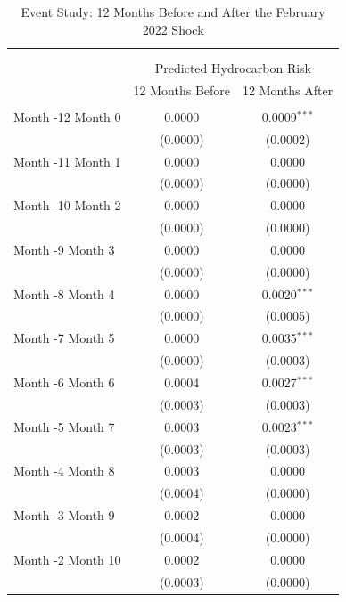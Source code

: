 
\begin{table}[!htbp] \centering 
  \caption{Event Study: 12 Months Before and After the February 2022 Shock} 
  \label{tab:eventstudy_12m_symmetric} 
\scriptsize 
\begin{tabular}{@{\extracolsep{5pt}}lcc} 
\\[-1.8ex]\hline 
\hline \\[-1.8ex] 
\\[-1.8ex] & \multicolumn{2}{c}{Predicted Hydrocarbon Risk} \\ 
 & 12 Months Before & 12 Months After \\ 
\hline \\[-1.8ex] 
 Month -12  \hfill  Month 0 & 0.0000 & 0.0009$^{***}$ \\ 
  & (0.0000) & (0.0002) \\ 
  Month -11  \hfill  Month 1 & 0.0000 & 0.0000 \\ 
  & (0.0000) & (0.0000) \\ 
  Month -10  \hfill  Month 2 & 0.0000 & 0.0000 \\ 
  & (0.0000) & (0.0000) \\ 
  Month -9  \hfill  Month 3 & 0.0000 & 0.0000 \\ 
  & (0.0000) & (0.0000) \\ 
  Month -8  \hfill  Month 4 & 0.0000 & 0.0020$^{***}$ \\ 
  & (0.0000) & (0.0005) \\ 
  Month -7  \hfill  Month 5 & 0.0000 & 0.0035$^{***}$ \\ 
  & (0.0000) & (0.0003) \\ 
  Month -6  \hfill  Month 6 & 0.0004 & 0.0027$^{***}$ \\ 
  & (0.0003) & (0.0003) \\ 
  Month -5  \hfill  Month 7 & 0.0003 & 0.0023$^{***}$ \\ 
  & (0.0003) & (0.0003) \\ 
  Month -4  \hfill  Month 8 & 0.0003 & 0.0000 \\ 
  & (0.0004) & (0.0000) \\ 
  Month -3  \hfill  Month 9 & 0.0002 & 0.0000 \\ 
  & (0.0004) & (0.0000) \\ 
  Month -2  \hfill  Month 10 & 0.0002 & 0.0000 \\ 
  & (0.0003) & (0.0000) \\ 

\end{tabular}
\end{table}
